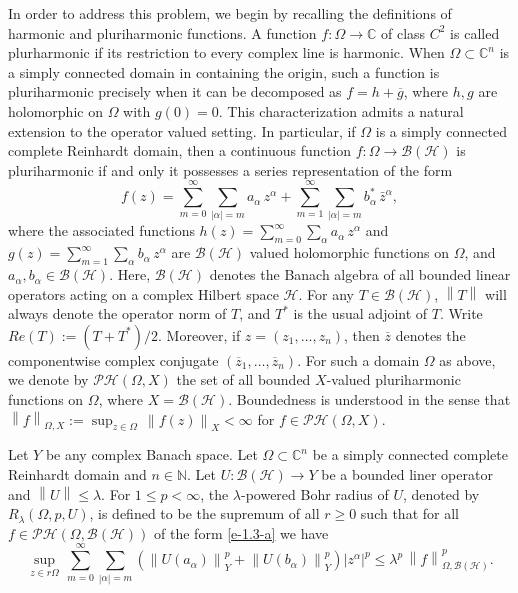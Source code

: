 \documentclass[a4paper,11pt, reqno]{amsart}
\theoremstyle{definition}
\newcommand{\norm}[1]{\left\lVert#1\right\rVert}
\begin{document}
In order to address this problem, we begin by recalling the definitions of harmonic and pluriharmonic functions. A function $f:\Omega \rightarrow \mathbb{C}$ of class $C^2$ is called plurharmonic if its restriction to every complex line is harmonic. When $\Omega \subset\mathbb{C}^n$ is a simply connected domain in containing the origin, such a function is pluriharmonic precisely when it can be decomposed as $f=h+\overline{g}$, where $h,g$ are holomorphic on $\Omega$ with $g(0)=0$. This characterization admits a natural extension to the operator valued setting. In particular, if $\Omega$ is a simply connected complete Reinhardt domain, then a continuous function $f:\Omega \rightarrow \mathcal{B}(\mathcal{H})$ is pluriharmonic if and only it possesses a series representation of the form
\begin{equation} \label{e-1.3-a}
	f(z)=\sum_{m=0}^{\infty} \sum_{|\alpha|=m} a_{\alpha}\, z^{\alpha} + \sum_{m=1}^{\infty} \sum_{|\alpha|=m} b^{*}_{\alpha}\, \bar{z}^{\alpha},
\end{equation} 
where the associated functions $h(z)=\sum_{m=0}^{\infty} \sum_{\alpha} a_{\alpha}\, z^{\alpha}$ and $g(z)=\sum_{m=1}^{\infty} \sum_{\alpha} b_{\alpha}\, z^{\alpha}$ are $\mathcal{B}(\mathcal{H})$ valued holomorphic functions on $\Omega$, and $a_{\alpha}, b_{\alpha} \in \mathcal{B}(\mathcal{H})$. Here, $\mathcal{B}(\mathcal{H})$ denotes the Banach algebra of all bounded linear operators acting on a complex Hilbert space $\mathcal{H}$. For any $T \in \mathcal{B}(\mathcal{H})$, $\norm{T}$ will always denote the operator norm of $T$, and $T^{*}$ is the usual adjoint of $T$. Write $Re(T):=(T+T^*)/2$. Moreover, if $z=(z_1, \ldots, z_{n})$, then $\overline{z}$ denotes the componentwise complex conjugate $(\overline{z}_1, \ldots,\overline{z}_n)$. For such a domain $\Omega$ as above, we denote by $\mathcal{PH}(\Omega,X)$ the set of all bounded $X$-valued pluriharmonic functions on $\Omega$, where $X=\mathcal{B}(\mathcal{H})$. Boundedness is understood in the sense that $\norm{f}_{\Omega,X}:=\sup_{z \in \Omega}\,\norm{f(z)}_{X} < \infty$ for $f \in \mathcal{PH}(\Omega,X)$.
\vspace{2mm}

Let $Y$ be any complex Banach space. Let $\Omega\subset \mathbb{C}^n$ be a simply connected complete Reinhardt domain and $n\in \mathbb{N}$. Let $U:\mathcal{B}(\mathcal{H})\rightarrow Y$ be a bounded liner operator and $\norm{U} \leq \lambda$. For $1 \leq p < \infty$, the $\lambda$-powered Bohr radius of $U$, denoted by $R_{\lambda}(\Omega, p,U)$, is defined to be the supremum of all $r\geq 0$ such that for all $f \in \mathcal{PH}(\Omega,\mathcal{B}(\mathcal{H}))$ of the form \eqref{e-1.3-a} we have 
\begin{equation} \label{e-1.4-a}
	\sup_{z \in r\Omega}\,\sum_{m=0}^{\infty} \sum_{|\alpha|=m} (\norm{U(a_{\alpha})}^p_{Y} + \norm{U(b_{\alpha})}^p_{Y})|z^\alpha|^p \leq \lambda^p\,\norm{f}^p_{\Omega,\mathcal{B}(\mathcal{H})}. 
\end{equation}
\end{document}

